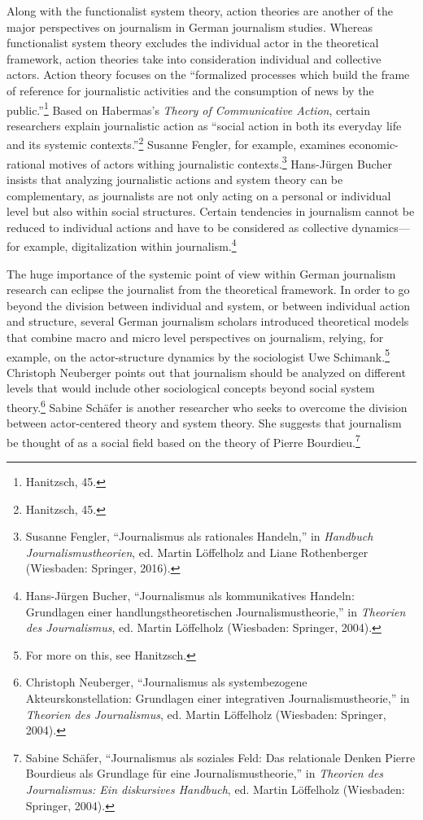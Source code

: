 \documentclass{tufte-handout}
\begin{document}
Along with the functionalist system theory, action theories are another
of the major perspectives on journalism in German journalism studies.
Whereas functionalist system theory excludes the individual actor in the
theoretical framework, action theories take into consideration
individual and collective actors. Action theory focuses on the
``formalized processes which build the frame of reference for
journalistic activities and the consumption of news by the
public.''\footnote{Hanitzsch, 45.} Based on Habermas's \emph{Theory of
Communicative Action}, certain researchers explain journalistic action
as ``social action in both its everyday life and its systemic
contexts.''\footnote{Hanitzsch, 45.} Susanne Fengler, for example,
examines economic-rational motives of actors withing journalistic
contexts.\footnote{Susanne Fengler, ``Journalismus als rationales
  Handeln,'' in \emph{Handbuch Journalismustheorien}, ed. Martin
  Löffelholz and Liane Rothenberger (Wiesbaden: Springer, 2016).}
Hans-Jürgen Bucher insists that analyzing journalistic actions and
system theory can be complementary, as journalists are not only acting
on a personal or individual level but also within social structures.
Certain tendencies in journalism cannot be reduced to individual actions
and have to be considered as collective dynamics---for example,
digitalization within journalism.\footnote{Hans-Jürgen Bucher,
  ``Journalismus als kommunikatives Handeln: Grundlagen einer
  handlungstheoretischen Journalismustheorie,'' in \emph{Theorien des
  Journalismus}, ed. Martin Löffelholz (Wiesbaden: Springer, 2004).}

The huge importance of the systemic point of view within German
journalism research can eclipse the journalist from the theoretical
framework. In order to go beyond the division between individual and
system, or between individual action and structure, several German
journalism scholars introduced theoretical models that combine macro and
micro level perspectives on journalism, relying, for example, on the
actor-structure dynamics by the sociologist Uwe Schimank.\footnote{For
  more on this, see Hanitzsch.} Christoph Neuberger points out that
journalism should be analyzed on different levels that would include
other sociological concepts beyond social system theory.\footnote{Christoph
  Neuberger, ``Journalismus als systembezogene Akteurskonstellation:
  Grundlagen einer integrativen Journalismustheorie,'' in \emph{Theorien
  des Journalismus}, ed. Martin Löffelholz (Wiesbaden: Springer, 2004).}
Sabine Schäfer is another researcher who seeks to overcome the division
between actor-centered theory and system theory. She suggests that
journalism be thought of as a social field based on the theory of Pierre
Bourdieu.\footnote{Sabine Schäfer, ``Journalismus als soziales Feld: Das
  relationale Denken Pierre Bourdieus als Grundlage für eine
  Journalismustheorie,'' in \emph{Theorien des Journalismus: Ein
  diskursives Handbuch}, ed. Martin Löffelholz (Wiesbaden: Springer,
  2004).}
\end{document}

